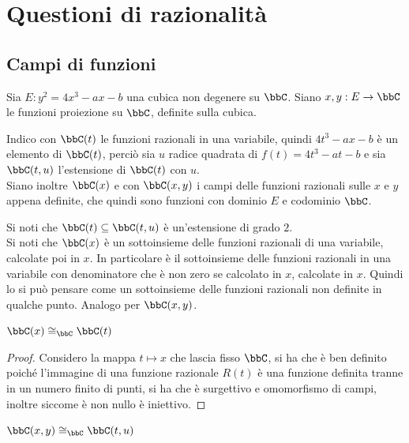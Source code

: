 \chapter{Questioni di razionalità}


\section{Campi di funzioni}

Sia $E: y^2=4x^3-ax-b$ una cubica non degenere su $\bbC$.
Siano $x,y:E\rightarrow\bbC$ le funzioni proiezione su $\bbC$, definite sulla cubica.
\begin{definizione}
Indico con $\bbC(t)$ le funzioni razionali in una variabile, quindi $4t^3-ax-b$ è un elemento di $\bbC(t)$, perciò sia $u$ radice quadrata di $f(t)=4t^3-at-b$ e sia $\bbC(t,u)$ l'estensione di $\bbC(t)$ con $u$.\\
Siano inoltre $\bbC(x)$ e con $\bbC(x,y)$ i campi delle funzioni razionali sulle $x$ e $y$ appena definite, che quindi sono funzioni con dominio $E$ e codominio $\bbC$.
\end{definizione}

\begin{osservazione}
Si noti che $\bbC(t)\subseteq\bbC(t,u)$ è un'estensione di grado $2$.\\
Si noti che $\bbC(x)$ è un sottoinsieme delle funzioni razionali di una variabile, calcolate poi in $x$. In particolare è il sottoinsieme delle funzioni razionali in una variabile con denominatore che è non zero se calcolato in $x$, calcolate in $x$. Quindi lo si può pensare come un sottoinsieme delle funzioni razionali non definite in qualche punto.
Analogo per $\bbC(x,y)$.
\end{osservazione}

\begin{proposizione}
$\bbC(x)\cong_{\bbC}\bbC(t)$
\end{proposizione}

\begin{proof}
Considero la mappa $t\mapsto x$ che lascia fisso $\bbC$, si ha che è ben definito poiché l'immagine di una funzione razionale $R(t)$ è una funzione definita tranne in un numero finito di punti, si ha che è surgettivo e omomorfismo di campi, inoltre siccome è non nullo è iniettivo.
\end{proof}

\begin{proposizione}
$\bbC(x,y)\cong_{\bbC}\bbC(t,u)$
\end{proposizione}

